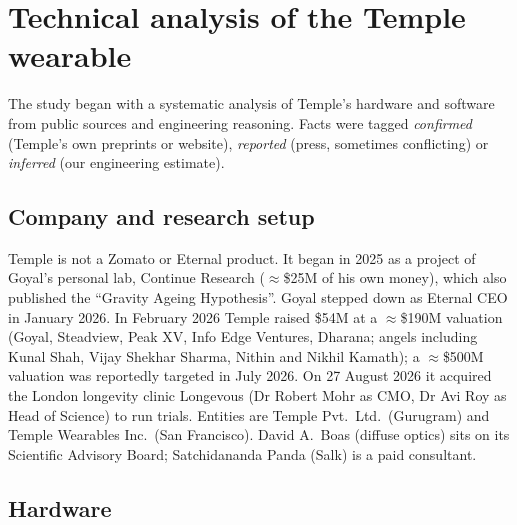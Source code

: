 \section{Technical analysis of the Temple wearable}
\label{app:temple}

The study began with a systematic analysis of Temple's hardware and software from public sources \cite{temple} and engineering reasoning. Facts were tagged \emph{confirmed} (Temple's own preprints or website), \emph{reported} (press, sometimes conflicting) or \emph{inferred} (our engineering estimate).

\subsection{Company and research setup}

Temple is not a Zomato or Eternal product. It began in 2025 as a project of Goyal's personal lab, Continue Research ($\approx$\$25M of his own money), which also published the ``Gravity Ageing Hypothesis''. Goyal stepped down as Eternal CEO in January 2026. In February 2026 Temple raised \$54M at a $\approx$\$190M valuation (Goyal, Steadview, Peak XV, Info Edge Ventures, Dharana; angels including Kunal Shah, Vijay Shekhar Sharma, Nithin and Nikhil Kamath); a $\approx$\$500M valuation was reportedly targeted in July 2026. On 27 August 2026 it acquired the London longevity clinic Longevous (Dr Robert Mohr as CMO, Dr Avi Roy as Head of Science) to run trials. Entities are Temple Pvt.\ Ltd.\ (Gurugram) and Temple Wearables Inc.\ (San Francisco). David A.\ Boas (diffuse optics) sits on its Scientific Advisory Board; Satchidananda Panda (Salk) is a paid consultant.

\subsection{Hardware}

